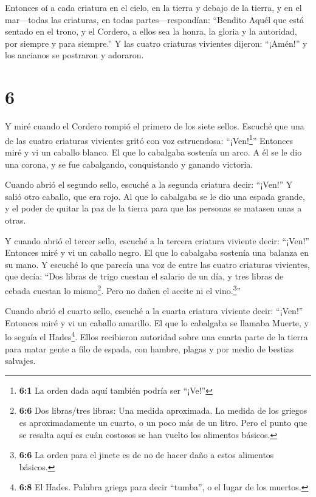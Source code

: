 Entonces oí a cada criatura en el cielo, en la tierra y
debajo de la tierra, y en el mar---todas las criaturas, en todas
partes---respondían: ``Bendito Aquél que está sentado en el trono, y el
Cordero, a ellos sea la honra, la gloria y la autoridad, por siempre y
para siempre.''  Y las cuatro criaturas vivientes dijeron:
``¡Amén!'' y los ancianos se postraron y adoraron.

\hypertarget{section-5}{%
\section{6}\label{section-5}}

 Y miré cuando el Cordero rompió el primero de los siete
sellos. Escuché que una de las cuatro criaturas vivientes gritó con voz
estruendosa: ``¡Ven!\footnote{\textbf{6:1} La orden dada aquí también
  podría ser ``¡Ve!''}''  Entonces miré y vi un caballo
blanco. El que lo cabalgaba sostenía un arco. A él se le dio una corona,
y se fue cabalgando, conquistando y ganando victoria.

 Cuando abrió el segundo sello, escuché a la segunda
criatura decir: ``¡Ven!''  Y salió otro caballo, que era
rojo. Al que lo cabalgaba se le dio una espada grande, y el poder de
quitar la paz de la tierra para que las personas se matasen unas a
otras.

 Y cuando abrió el tercer sello, escuché a la tercera
criatura viviente decir: ``¡Ven!'' Entonces miré y vi un caballo negro.
El que lo cabalgaba sostenía una balanza en su mano.  Y
escuché lo que parecía una voz de entre las cuatro criaturas vivientes,
que decía: ``Dos libras de trigo cuestan el salario de un día, y tres
libras de cebada cuestan lo mismo\footnote{\textbf{6:6} Dos libras/tres
  libras: Una medida aproximada. La medida de los griegos es
  aproximadamente un cuarto, o un poco más de un litro. Pero el punto
  que se resalta aquí es cuán costosos se han vuelto los alimentos
  básicos.}. Pero no dañen el aceite ni el vino.\footnote{\textbf{6:6}
  La orden para el jinete es de no de hacer daño a estos alimentos
  básicos.}''

 Cuando abrió el cuarto sello, escuché a la cuarta criatura
viviente decir: ``¡Ven!''  Entonces miré y vi un caballo
amarillo. El que lo cabalgaba se llamaba Muerte, y lo seguía el
Hades\footnote{\textbf{6:8} El Hades. Palabra griega para decir
  ``tumba'', o el lugar de los muertos.}. Ellos recibieron autoridad
sobre una cuarta parte de la tierra para matar gente a filo de espada,
con hambre, plagas y por medio de bestias salvajes.

